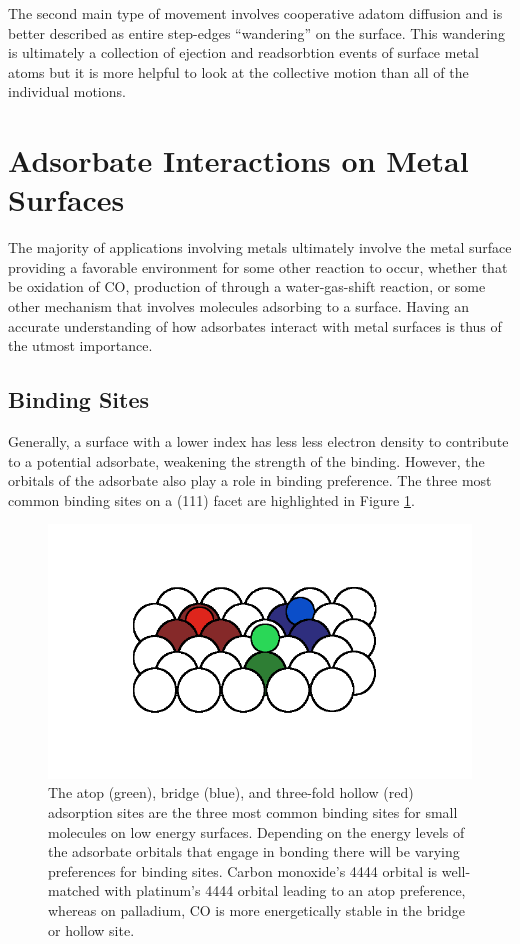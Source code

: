 The second main type of movement involves cooperative adatom diffusion and is
better described as entire step-edges ``wandering'' on the surface. This
wandering is ultimately a collection of ejection and readsorbtion events of
surface metal atoms but it is more helpful to look at the collective motion
than all of the individual motions.

\section{Adsorbate Interactions on Metal Surfaces}
The majority of applications involving metals ultimately involve the metal
surface providing a favorable environment for some other reaction to occur,
whether that be oxidation of CO, production of  through a
water-gas-shift reaction, or some other mechanism that involves molecules
adsorbing to a surface. Having an accurate understanding of how adsorbates
interact with metal surfaces is thus of the utmost importance. 

\subsection{Binding Sites}
Generally, a surface with a lower index has less less electron density to
contribute to a potential adsorbate, weakening the strength of the binding.
However, the orbitals of the adsorbate also play a role in binding preference.
The three most common binding sites on a (111) facet are highlighted in Figure
\ref{fig:binding}.
\begin{figure}
  \includegraphics[width=\linewidth]{../figures/chap1/binding.pdf}
  \caption{The atop (green), bridge (blue), and three-fold hollow (red)
adsorption sites are the three most common binding sites for small molecules on
low energy surfaces. Depending on the energy levels of the adsorbate orbitals
that engage in bonding there will be varying preferences for binding sites.
Carbon monoxide's 4444 orbital is well-matched with platinum's 4444 orbital
leading to an atop preference, whereas on palladium, CO is more energetically
stable in the bridge or hollow site.}
\label{fig:binding}
\end{figure}


